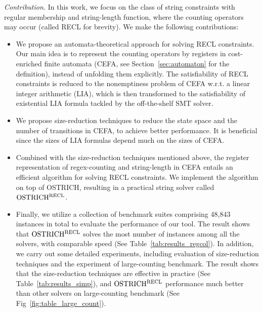 \medskip
\noindent 
\emph{Contribution.} In this work, we focus on the class of string constraints with regular membership and string-length function, where the counting operators may occur (called RECL for brevity). We make the following contributions: 
\vspace{-0.5mm}
\begin{itemize}
  \item We propose an automata-theoretical approach for solving RECL constraints. 
  Our main idea is to represent the counting operators by registers in cost-enriched finite automata (CEFA, see Section~\ref{sec:automaton} for the definition), instead of unfolding them explicitly. The satisfiability of RECL constraints is reduced to the nonemptiness problem of CEFA w.r.t. a linear integer arithmetic (LIA), which is then transformed to the satisfiability of existential LIA formula tackled by the off-the-shelf SMT solver.
  \item We propose size-reduction techniques to reduce the state space and the number of transitions in CEFA, to achieve better performance. It is beneficial since the sizes of LIA formulas depend much on the sizes of CEFA.
  \item Combined with the size-reduction techniques mentioned above, the register representation of regex-counting and string-length in CEFA entails an efficient algorithm for solving RECL constraints. We implement the algorithm on top of OSTRICH, resulting in a practical string solver called $\rm OSTRICH^{RECL}$. 
  \item Finally, we utilize a collection of benchmark suites comprising 48,843 instances in total to evaluate the performance of our tool. The result shows that $\rm OSTRICH^{RECL}$ solves the most number of instances among all the solvers, with comparable speed (See Table~\ref{tab:results_regcol}). In addition, we carry out some detailed experiments, including evaluation of size-reduction techniques  and the experiment of large-counting benchmark. The result shows that the size-reduction techniques are effective in practice (See Table~\ref{tab:results_simp}), and $\rm OSTRICH^{RECL}$ performance much better than other solvers on large-counting benchmark (See Fig~\ref{fig:table_large_count}).

\end{itemize}
